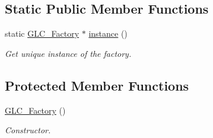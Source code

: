 \subsection*{Static Public Member Functions}
\begin{DoxyCompactItemize}
\item 
static \hyperlink{class_g_l_c___factory}{G\-L\-C\-\_\-\-Factory} $\ast$ \hyperlink{class_g_l_c___factory_a4f5749eb5d0b31f2022d894067489e32}{instance} ()
\begin{DoxyCompactList}\small\item\em Get unique instance of the factory. \end{DoxyCompactList}\end{DoxyCompactItemize}
\subsection*{Protected Member Functions}
\begin{DoxyCompactItemize}
\item 
\hyperlink{class_g_l_c___factory_a841385e87d1b41829487b7788a004a55}{G\-L\-C\-\_\-\-Factory} ()
\begin{DoxyCompactList}\small\item\em Constructor. \end{DoxyCompactList}\end{DoxyCompactItemize}
